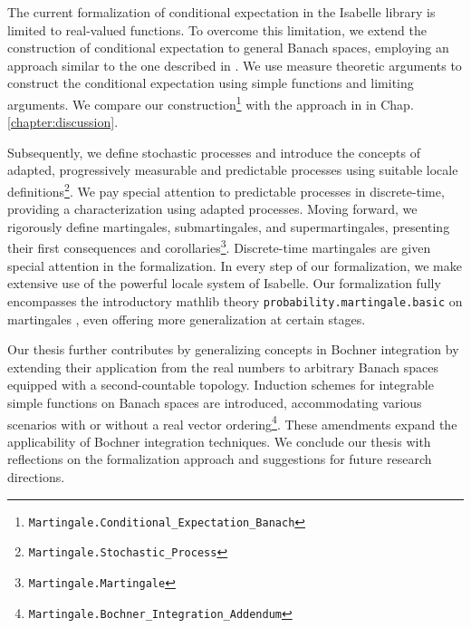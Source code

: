 The current formalization of conditional expectation in the Isabelle library is limited to real-valued functions. To overcome this limitation, we extend the construction of conditional expectation to general Banach spaces, employing an approach similar to the one described in \cite{Hytoenen_2016}. We use measure theoretic arguments to construct the conditional expectation using simple functions and limiting arguments. We compare our construction\footnote{\texttt{Martingale.Conditional\_Expectation\_Banach}} with the approach in \cite{Hytoenen_2016} in Chap. \ref{chapter:discussion}.

Subsequently, we define stochastic processes and introduce the concepts of adapted, progressively measurable and predictable processes using suitable locale definitions\footnote{\texttt{Martingale.Stochastic\_Process}}. We pay special attention to predictable processes in discrete-time, providing a characterization using adapted processes. Moving forward, we rigorously define martingales, submartingales, and supermartingales, presenting their first consequences and corollaries\footnote{\texttt{Martingale.Martingale}}. Discrete-time martingales are given special attention in the formalization. In every step of our formalization, we make extensive use of the powerful locale system of Isabelle.
Our formalization fully encompasses the introductory \textsf{mathlib} theory \texttt{probability.mar\-tingale.basic} on martingales \cite{Degenne_Ying_2022}, even offering more generalization at certain stages.

Our thesis further contributes by generalizing concepts in Bochner integration by extending their application from the real numbers to arbitrary Banach spaces equipped with a second-countable topology. Induction schemes for integrable simple functions on Banach spaces are introduced, accommodating various scenarios with or without a real vector ordering\footnote{\texttt{Martingale.Bochner\_Integration\_Addendum}}. These amendments expand the applicability of Bochner integration techniques.
We conclude our thesis with reflections on the formalization approach and suggestions for future research directions.